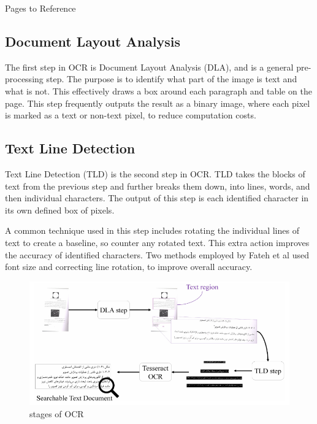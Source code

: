 \documentclass[sigplan,screen,nonacm]{acmart-tagged}
\begin{document}
Pages to Reference\cite{Avyodri:2022,Thorat:2022}

\subsection{Document Layout Analysis}
\label{DLA}

The first step in OCR is Document Layout Analysis (DLA), and is a general pre-processing step. The purpose is to identify what part of the image is text and what is not. This effectively draws a box around each paragraph and table on the page.
This step frequently outputs the result as a binary image, where each pixel is marked as a text or non-text pixel, to reduce computation costs.

\subsection{Text Line Detection}
\label{TLD}

Text Line Detection (TLD) is the second step in OCR. TLD takes the blocks of text from the previous step and further breaks them down, into lines, words, and then individual characters. The output of this step is each identified character in its own defined box of pixels.

A common technique used in this step includes rotating the individual lines of text to create a baseline, so counter any rotated text. This extra action improves the accuracy of identified characters. 
Two methods employed by Fateh et al\citep{Fateh:2024} used font size and correcting line rotation, to improve overall accuracy.


\begin{figure}
  \includegraphics[width=\linewidth]{stages.png}
  \caption{stages of OCR}
  \label{fig:tld}
\end{figure}
\end{document}
